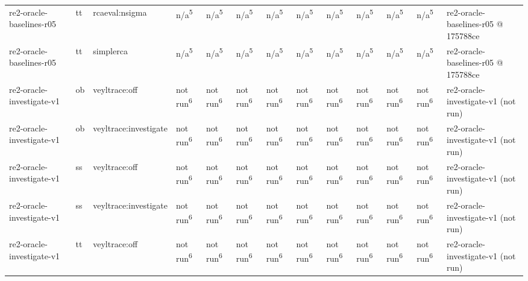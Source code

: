\begin{table}[t]
\begin{tabular}{lllllllllllll}
re2-oracle-baselines-r05 & tt & rcaeval:nsigma & n/a\textsuperscript{5} & n/a\textsuperscript{5} & n/a\textsuperscript{5} & n/a\textsuperscript{5} & n/a\textsuperscript{5} & n/a\textsuperscript{5} & n/a\textsuperscript{5} & n/a\textsuperscript{5} & n/a\textsuperscript{5} & re2-oracle-baselines-r05 @ 175788ce \\
re2-oracle-baselines-r05 & tt & simplerca & n/a\textsuperscript{5} & n/a\textsuperscript{5} & n/a\textsuperscript{5} & n/a\textsuperscript{5} & n/a\textsuperscript{5} & n/a\textsuperscript{5} & n/a\textsuperscript{5} & n/a\textsuperscript{5} & n/a\textsuperscript{5} & re2-oracle-baselines-r05 @ 175788ce \\
re2-oracle-investigate-v1 & ob & veyltrace:off & not run\textsuperscript{6} & not run\textsuperscript{6} & not run\textsuperscript{6} & not run\textsuperscript{6} & not run\textsuperscript{6} & not run\textsuperscript{6} & not run\textsuperscript{6} & not run\textsuperscript{6} & not run\textsuperscript{6} & re2-oracle-investigate-v1 (not run) \\
re2-oracle-investigate-v1 & ob & veyltrace:investigate & not run\textsuperscript{6} & not run\textsuperscript{6} & not run\textsuperscript{6} & not run\textsuperscript{6} & not run\textsuperscript{6} & not run\textsuperscript{6} & not run\textsuperscript{6} & not run\textsuperscript{6} & not run\textsuperscript{6} & re2-oracle-investigate-v1 (not run) \\
re2-oracle-investigate-v1 & ss & veyltrace:off & not run\textsuperscript{6} & not run\textsuperscript{6} & not run\textsuperscript{6} & not run\textsuperscript{6} & not run\textsuperscript{6} & not run\textsuperscript{6} & not run\textsuperscript{6} & not run\textsuperscript{6} & not run\textsuperscript{6} & re2-oracle-investigate-v1 (not run) \\
re2-oracle-investigate-v1 & ss & veyltrace:investigate & not run\textsuperscript{6} & not run\textsuperscript{6} & not run\textsuperscript{6} & not run\textsuperscript{6} & not run\textsuperscript{6} & not run\textsuperscript{6} & not run\textsuperscript{6} & not run\textsuperscript{6} & not run\textsuperscript{6} & re2-oracle-investigate-v1 (not run) \\
re2-oracle-investigate-v1 & tt & veyltrace:off & not run\textsuperscript{6} & not run\textsuperscript{6} & not run\textsuperscript{6} & not run\textsuperscript{6} & not run\textsuperscript{6} & not run\textsuperscript{6} & not run\textsuperscript{6} & not run\textsuperscript{6} & not run\textsuperscript{6} & re2-oracle-investigate-v1 (not run) \\

\end{tabular}
\end{table}
